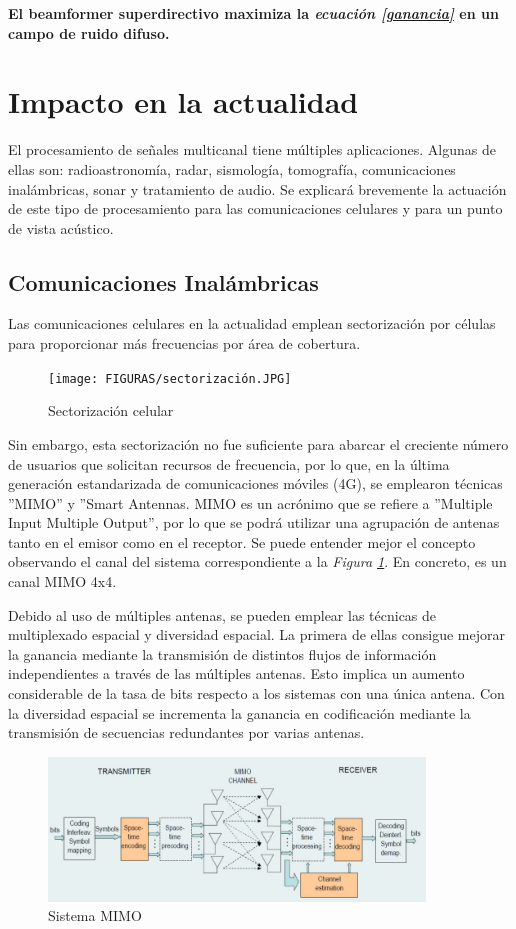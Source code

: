 \documentclass[a4paper,11pt]{book}
\begin{document}
	\textbf{		El beamformer superdirectivo maximiza la \textit{ecuación \ref{ganancia}} en un campo de ruido difuso.}
	
	\section{Impacto en la actualidad}
	El procesamiento de señales multicanal tiene múltiples aplicaciones. Algunas de ellas son: radioastronomía, radar, sismología, tomografía, comunicaciones inalámbricas, sonar y tratamiento de audio. Se explicará brevemente la actuación de este tipo de procesamiento para las comunicaciones celulares y para un punto de vista acústico.
		\subsection{Comunicaciones Inalámbricas}
		Las comunicaciones celulares en la actualidad emplean sectorización por células para proporcionar más frecuencias por área de cobertura.
		\begin{figure}[hbtp]
		\centering
		\texttt{[image: FIGURAS/sectorización.JPG]}
		\caption{Sectorización celular}
		\end{figure}
		
	
	Sin embargo, esta sectorización no fue suficiente para abarcar el creciente número de usuarios que solicitan recursos de frecuencia, por lo que, en la última generación estandarizada de comunicaciones móviles (4G), se emplearon técnicas ''MIMO'' y ''Smart Antennas. MIMO es un acrónimo que se refiere a ''Multiple Input Multiple Output'', por lo que se podrá utilizar una agrupación de antenas tanto en el emisor como en el receptor. Se puede entender mejor el concepto observando el canal del sistema correspondiente a la \textit{Figura \ref{MIMO}}. En concreto, es un canal MIMO 4x4.
		
		Debido al uso de múltiples antenas, se pueden emplear las técnicas de multiplexado espacial y diversidad espacial. La primera de ellas consigue mejorar la ganancia mediante la transmisión de distintos flujos de información independientes a través de las múltiples antenas. Esto implica un aumento considerable de la tasa de bits respecto a los sistemas con una única antena. Con la diversidad espacial se incrementa la ganancia en codificación mediante la transmisión de secuencias redundantes por varias antenas.
		
		\begin{figure}[hbtp]
		\centering
		\includegraphics[width = 10cm]{FIGURAS/sistema_MIMO.JPG}
		\caption{Sistema MIMO}
		\label{MIMO}
		\end{figure}
\end{document}
